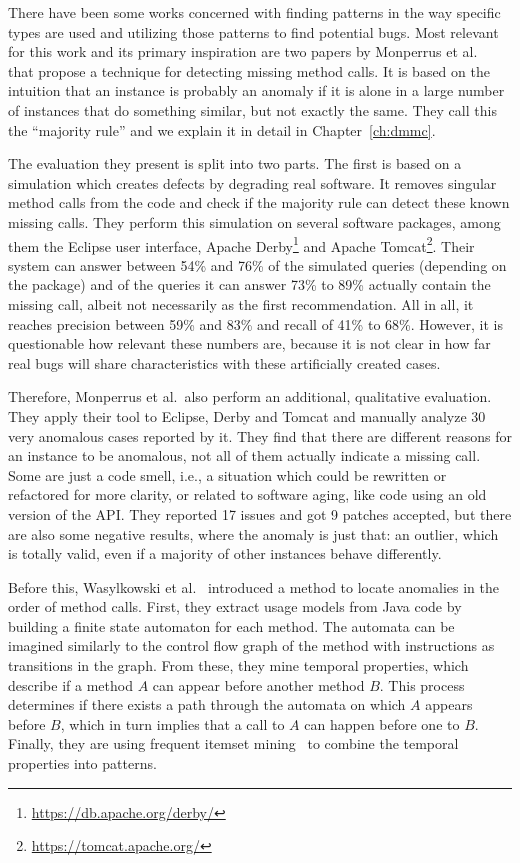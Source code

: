 There have been some works concerned with finding patterns in the way specific types are used and utilizing those patterns to find potential bugs.
Most relevant for this work and its primary inspiration are two papers by Monperrus et al.~\cite{monperrus2010detecting}\cite{monperrus2013detecting} that propose a technique for detecting missing method calls.
It is based on the intuition that an instance is probably an anomaly if it is alone in a large number of instances that do something similar, but not exactly the same.
They call this the ``majority rule'' and we explain it in detail in Chapter~\ref{ch:dmmc}.

The evaluation they present is split into two parts.
The first is based on a simulation which creates defects by degrading real software.
It removes singular method calls from the code and check if the majority rule can detect these known missing calls.
They perform this simulation on several software packages, among them the Eclipse user interface, Apache Derby\footnote{\url{https://db.apache.org/derby/}} and Apache Tomcat\footnote{\url{https://tomcat.apache.org/}}.
Their system can answer between 54\% and 76\% of the simulated queries (depending on the package) and of the queries it can answer 73\% to 89\% actually contain the missing call, albeit not necessarily as the first recommendation.
All in all, it reaches precision between 59\% and 83\% and recall of 41\% to 68\%.
However, it is questionable how relevant these numbers are, because it is not clear in how far real bugs will share characteristics with these artificially created cases.

Therefore, Monperrus et al.\ also perform an additional, qualitative evaluation.
They apply their tool to Eclipse, Derby and Tomcat and manually analyze 30 very anomalous cases reported by it.
They find that there are different reasons for an instance to be anomalous, not all of them actually indicate a missing call.
Some are just a code smell, i.e., a situation which could be rewritten or refactored for more clarity, or related to software aging, like code using an old version of the API\@.
They reported 17 issues and got 9 patches accepted, but there are also some negative results, where the anomaly is just that: an outlier, which is totally valid, even if a majority of other instances behave differently.

Before this, Wasylkowski et al.~\cite{wasylkowski2007detecting} introduced a method to locate anomalies in the order of method calls.
First, they extract usage models from Java code by building a finite state automaton for each method.
The automata can be imagined similarly to the control flow graph of the method with instructions as transitions in the graph.
From these, they mine temporal properties, which describe if a method $A$ can appear before another method $B$.
This process determines if there exists a path through the automata on which $A$ appears before $B$, which in turn implies that a call to $A$ can happen before one to $B$.
Finally, they are using frequent itemset mining~\cite{han2006data} to combine the temporal properties into patterns.

